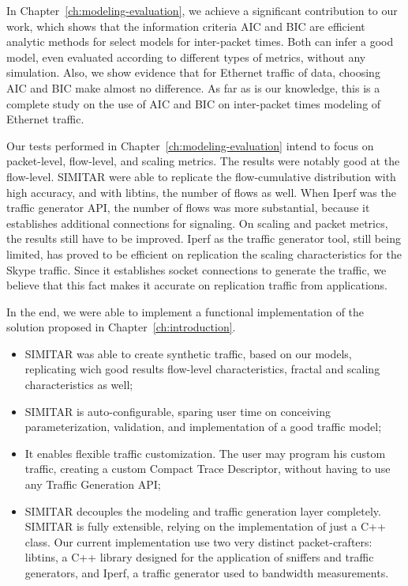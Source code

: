 In Chapter~\ref{ch:modeling-evaluation}, we achieve a significant contribution to our work, which shows that the information criteria AIC and BIC are efficient analytic methods for select models for inter-packet times. Both can infer a good model, even evaluated according to different types of metrics, without any simulation. Also, we show evidence that for Ethernet traffic of data, choosing AIC and BIC make almost no difference. As far as is our knowledge, this is a complete study on the use of AIC and BIC on inter-packet times modeling of Ethernet traffic.

Our tests performed in Chapter~\ref{ch:modeling-evaluation} intend to focus on packet-level, flow-level, and scaling metrics. The results were notably good at the flow-level. SIMITAR were able to replicate the flow-cumulative distribution with high accuracy, and with libtins, the number of flows as well. When Iperf was the traffic generator API, the number of flows was more substantial, because it establishes additional connections for signaling. On scaling and packet metrics, the results still have to be improved. Iperf as the traffic generator tool, still being limited, has proved to be efficient on replication the scaling characteristics for the Skype traffic. Since it establishes socket connections to generate the traffic, we believe that this fact makes it accurate on replication traffic from applications.

In the end, we were able to implement a functional implementation of the solution proposed in Chapter~\ref{ch:introduction}.  
\begin{itemize}
\item SIMITAR was able to create synthetic traffic, based on our models, replicating wich good results flow-level characteristics, fractal and scaling characteristics as well;
\item SIMITAR is auto-configurable, sparing user time on conceiving parameterization, validation, and implementation of a good traffic model;
\item It enables flexible traffic customization. The user may program his custom traffic, creating a custom Compact Trace Descriptor, without having to use any Traffic Generation API;  
\item SIMITAR decouples the modeling and traffic generation layer completely. SIMITAR is fully extensible, relying on the implementation of just a C++ class.  Our current implementation use two very distinct packet-crafters: libtins, a C++ library designed for the application of sniffers and traffic generators, and Iperf, a traffic generator used to bandwidth measurements. 
\end{itemize}

